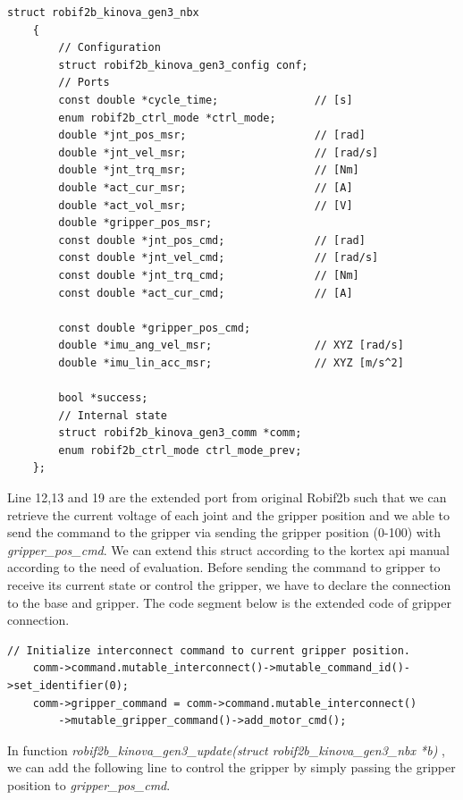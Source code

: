 \documentclass[report.tex]{subfiles}
\begin{document}
    \begin{lstlisting}[caption = {Struct of the enabled ports for base and actuator of Kinova kortex api in Robif2b},label={lst:Robif2b}]
    struct robif2b_kinova_gen3_nbx
    {
        // Configuration
        struct robif2b_kinova_gen3_config conf;
        // Ports
        const double *cycle_time;               // [s]
        enum robif2b_ctrl_mode *ctrl_mode;
        double *jnt_pos_msr;                    // [rad]
        double *jnt_vel_msr;                    // [rad/s]
        double *jnt_trq_msr;                    // [Nm]
        double *act_cur_msr;                    // [A]
        double *act_vol_msr;                    // [V]
        double *gripper_pos_msr;
        const double *jnt_pos_cmd;              // [rad]
        const double *jnt_vel_cmd;              // [rad/s]
        const double *jnt_trq_cmd;              // [Nm]
        const double *act_cur_cmd;              // [A]

        const double *gripper_pos_cmd;  
        double *imu_ang_vel_msr;                // XYZ [rad/s]
        double *imu_lin_acc_msr;                // XYZ [m/s^2]
        
        bool *success;
        // Internal state
        struct robif2b_kinova_gen3_comm *comm;
        enum robif2b_ctrl_mode ctrl_mode_prev;
    };
\end{lstlisting}
Line 12,13 and 19 are the extended port from original Robif2b such that we can retrieve the current voltage of each joint and the gripper position and we able to send the command to the gripper via sending the gripper position (0-100) with \textit{gripper\_pos\_cmd}. We can extend this struct according to the kortex api manual \cite{Kinovaapi} according to the need of evaluation.
Before sending the command to gripper to receive its current state or control the gripper, we have to declare the connection to the base and gripper. The code segment below is the extended code of gripper connection.
\begin{lstlisting}[caption = {Establish connection between base and gripper},label={lst:Robif2b_gripper}]
    // Initialize interconnect command to current gripper position.
    comm->command.mutable_interconnect()->mutable_command_id()->set_identifier(0);
    comm->gripper_command = comm->command.mutable_interconnect()
        ->mutable_gripper_command()->add_motor_cmd();
\end{lstlisting}

In function \textit{robif2b\_kinova\_gen3\_update(struct robif2b\_kinova\_gen3\_nbx *b)} , we can add the following line to control the gripper by simply passing the gripper position to \textit{gripper\_pos\_cmd}.
\end{document}
